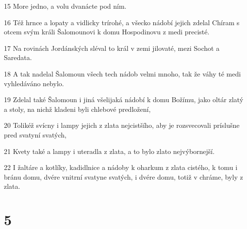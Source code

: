 \par 15 More jedno, a volu dvanácte pod ním.
\par 16 Též hrnce a lopaty a vidlicky trírohé, a všecko nádobí jejich zdelal Chíram s otcem svým králi Šalomounovi k domu Hospodinovu z medi precisté.
\par 17 Na rovinách Jordánských sléval to král v zemi jilovaté, mezi Sochot a Saredata.
\par 18 A tak nadelal Šalomoun všech tech nádob velmi mnoho, tak že váhy té medi vyhledáváno nebylo.
\par 19 Zdelal také Šalomoun i jiná všelijaká nádobí k domu Božímu, jako oltár zlatý a stoly, na nichž kladeni byli chlebové predložení,
\par 20 Tolikéž svícny i lampy jejich z zlata nejcistšího, aby je rozsvecovali príslušne pred svatyní svatých,
\par 21 Kvety také a lampy i uteradla z zlata, a to bylo zlato nejvýbornejší.
\par 22 I žaltáre a kotlíky, kadidlnice a nádoby k oharkum z zlata cistého, k tomu i bránu domu, dvére vnitrní svatyne svatých, i dvére domu, totiž v chráme, byly z zlata.

\chapter{5}

